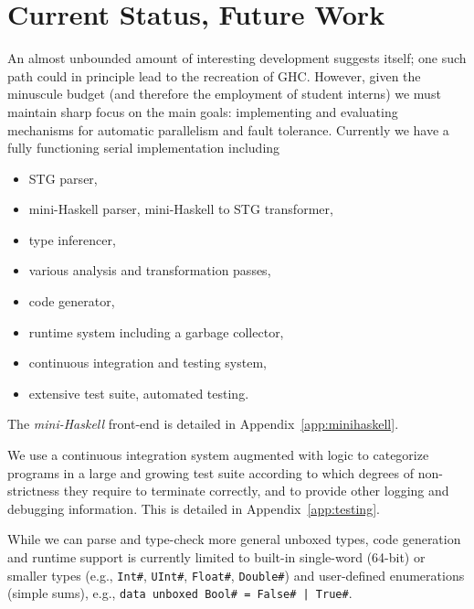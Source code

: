 \documentclass{llncs}
\begin{document}
\section{Current Status, Future Work}

An almost unbounded amount of interesting development suggests itself; one
such path could in principle lead to the recreation of GHC\@.  However, given
the minuscule budget (and therefore the employment of student interns) we must
maintain sharp focus on the main goals: implementing and evaluating mechanisms
for automatic parallelism and fault tolerance.  Currently we have
a fully functioning serial implementation including
\begin{itemize}
\item STG parser,
\item mini-Haskell parser, mini-Haskell to STG transformer,
\item type inferencer,
\item various analysis and transformation passes,
\item code generator,
\item runtime system including a garbage collector,
\item continuous integration and testing system,
\item extensive test suite, automated testing.
\end{itemize}

The \emph{mini-Haskell} front-end is detailed in Appendix~\ref{app:minihaskell}.

We use a continuous integration system augmented with logic to categorize
programs in a large and growing test suite according to which degrees of
non-strictness they require to terminate correctly, and to provide other
logging and debugging information.  This is detailed in Appendix~\ref{app:testing}.

While we can parse and type-check more general unboxed types, code generation
and runtime support is currently limited to built-in single-word (64-bit) or
smaller types (e.g., \texttt{Int\#}, \texttt{UInt\#}, \texttt{Float\#},
\texttt{Double\#}) and user-defined enumerations (simple sums), e.g.,
\texttt{data unboxed Bool\# = False\# | True\#}.
\end{document}

